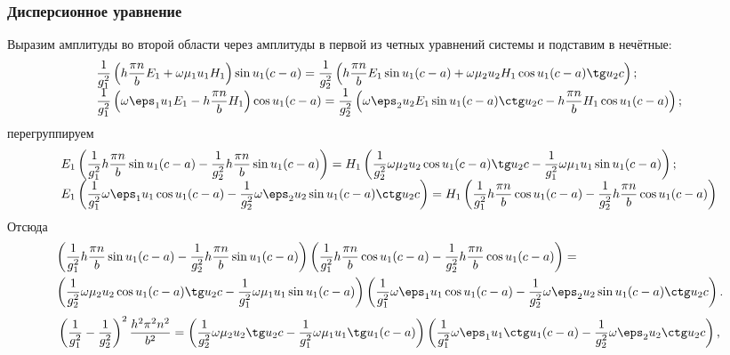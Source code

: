 \documentclass[12pt]{hedsemwork}
\renewcommand{\frac}{\dfrac}
\begin{document}
\subsubsection{Дисперсионное уравнение}
Выразим амплитуды во второй области через амплитуды в первой из четных уравнений
системы и подставим в нечётные:
\begin{equation}
\begin{array}{l}
    \frac{1}{g_1^2} \left(h \frac{\pi n}{b} E_1 + \omega\mu_1u_1H_1\right)
    \sin u_1 (c-a) =  \frac{1}{g_2^2}
    \left(h \frac{\pi n}{b} E_1 \sin u_1(c-a) +
    \omega\mu_2u_2H_1\cos u_1 (c-a) \tg u_2 c \right) ;\\
    \frac{1}{g_1^2}\left(\omega\eps_1u_1E_1-h \frac{\pi n}{b} H_1\right)
    \cos u_1 (c-a) = \frac{1}{g_2^2}
    \left(\omega\eps_2u_2E_1\sin u_1(c-a)\ctg u_2 c-
    h \frac{\pi n}{b} H_1\cos u_1 (c-a)\right) ;\\
\end{array}
    \label{eq:fast_waves_relations}
\end{equation}
перегруппируем
\[
\begin{array}{l}
    E_1\left(\frac{1}{g_1^2} h \frac{\pi n}{b}\sin u_1 (c-a) -
    \frac{1}{g_2^2}h \frac{\pi n}{b}\sin u_1(c-a)\right) =
    H_1\left(\frac{1}{g_2^2}\omega\mu_2u_2\cos u_1 (c-a) \tg u_2 c-
    \frac{1}{g_1^2}\omega\mu_1u_1\sin u_1 (c-a)\right);\\
    E_1\left(\frac{1}{g_1^2}\omega\eps_1u_1\cos u_1 (c-a)-
    \frac{1}{g_2^2}\omega\eps_2u_2\sin u_1(c-a)\ctg u_2 c\right)=
    H_1\left(\frac{1}{g_1^2}h \frac{\pi n}{b} \cos u_1 (c-a)-
    \frac{1}{g_2^2}h \frac{\pi n}{b} \cos u_1 (c-a)\right)
\end{array}
\]
Отсюда
\begin{align*}
    &\left(\frac{1}{g_1^2} h \frac{\pi n}{b}\sin u_1 (c-a) -
    \frac{1}{g_2^2}h \frac{\pi n}{b}\sin u_1(c-a)\right)\left(\frac{1}{g_1^2}h \frac{\pi n}{b} \cos u_1 (c-a)-
    \frac{1}{g_2^2}h \frac{\pi n}{b} \cos u_1 (c-a)\right) =\\
    & \left(\frac{1}{g_2^2}\omega\mu_2u_2\cos u_1 (c-a) \tg u_2 c-
    \frac{1}{g_1^2}\omega\mu_1u_1\sin u_1 (c-a)\right)
    \left(\frac{1}{g_1^2}\omega\eps_1u_1\cos u_1 (c-a)-
    \frac{1}{g_2^2}\omega\eps_2u_2\sin u_1(c-a)\ctg u_2 c\right).
\end{align*}
\[
    \left( \frac{1}{g_1^2} - \frac{1}{g_2^2} \right)^2\frac{h^2\pi^2n^2}{b^2}=
    \left(\frac{1}{g_2^2}\omega\mu_2u_2\tg u_2 c-
    \frac{1}{g_1^2}\omega\mu_1u_1\tg u_1 (c-a)\right)
    \left(\frac{1}{g_1^2}\omega\eps_1u_1\ctg u_1 (c-a)-
    \frac{1}{g_2^2}\omega\eps_2u_2\ctg u_2 c\right),
\]
\end{document}
